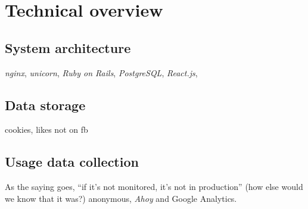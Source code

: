 
\chapter{Technical overview}

\section{System architecture}

\emph{nginx}, \emph{unicorn}, \emph{Ruby on Rails}, \emph{PostgreSQL}, \emph{React.js}, 

\section{Data storage}

cookies, likes not on fb

\section{Usage data collection}

As the saying goes, ``if it's not monitored, it's not in production'' \cite{monitored} (how else would we know that it was?) anonymous, \emph{Ahoy} and Google Analytics.